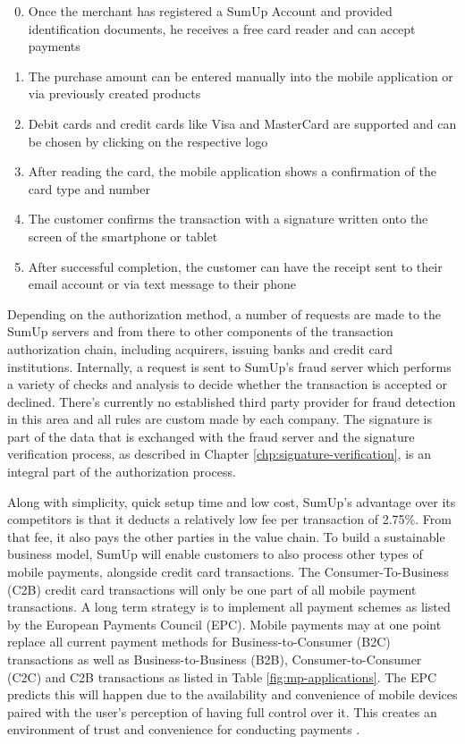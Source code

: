 \documentclass[a4paper, oneside]{csthesis}
\begin{document}
\begin{enumerate}
\setcounter{enumi}{-1}
    \item Once the merchant has registered a SumUp Account and provided identification documents, he receives a free card reader and can accept payments
    \item The purchase amount can be entered manually into the mobile application or via previously created products
    \item Debit cards and credit cards like Visa and MasterCard are supported and can be chosen by clicking on the respective logo
    \item After reading the card, the mobile application shows a confirmation of the card type and number
    \item The customer confirms the transaction with a signature written onto the screen of the smartphone or tablet
    \item After successful completion, the customer can have the receipt sent to their email account or via text message to their phone
\end{enumerate}


Depending on the authorization method, a number of requests are made to the SumUp servers and from there to other components of the transaction authorization chain, including acquirers, issuing banks and credit card institutions. Internally, a request is sent to SumUp's fraud server which performs a variety of checks and analysis to decide whether the transaction is accepted or declined. There's currently no established third party provider for fraud detection in this area and all rules are custom made by each company. The signature is part of the data that is exchanged with the fraud server and the signature verification process, as described in Chapter \ref{chp:signature-verification}, is an integral part of the  authorization process.

Along with simplicity, quick setup time and low cost, SumUp's advantage over its competitors is that it deducts a relatively low fee per transaction of 2.75\%. From that fee, it also pays the other parties in the value chain. To build a sustainable business model, SumUp will enable customers to also process other types of mobile payments, alongside credit card transactions. The Consumer-To-Business (C2B) credit card transactions will only be one part of all mobile payment transactions. A long term strategy is to implement all payment schemes as listed by the European Payments Council (EPC). Mobile payments may at one point replace all current payment methods for Business-to-Consumer (B2C) transactions as well as Business-to-Business (B2B), Consumer-to-Consumer (C2C) and C2B transactions as listed in Table \ref{fig:mp-applications}. The EPC predicts this will happen due to the availability and convenience of mobile devices paired with the user's perception of having full control over it. This creates an environment of trust and convenience for conducting payments \cite{mpwhitepaper}.
\end{document}
